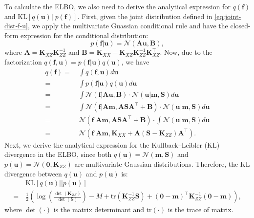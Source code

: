 \documentclass[journal]{IEEEtran}
\begin{document}
To calculate the ELBO, we also need to derive the analytical expression for $q(\mathbf{f})$ and $\text{KL}[q(\mathbf{u})||p(\mathbf{f})]$. 
First, given the joint distribution defined in \eqref{eq:joint-dist-f-u}, we apply the multivariate Guassian conditional rule and have the closed-form expression for the conditional distribution:
\[
    p(\mathbf{f}|\mathbf{u}) = \mathcal{N}(\mathbf{A} \mathbf{u}, \mathbf{B}),
\]
where $\mathbf{A} = \mathbf{K}_{XZ} \mathbf{K}_{ZZ}^{-1}$ and $\mathbf{B} = \mathbf{K}_{XX} - \mathbf{K}_{XZ} \mathbf{K}_{ZZ}^{-1} \mathbf{K}_{XZ}^\top$.
Now, due to the factorization $q(\mathbf{f}, \mathbf{u}) = p(\mathbf{f} | \mathbf{u}) q(\mathbf{u})$, we have
\begingroup
\allowdisplaybreaks
\begin{align*}
    q(\mathbf{f})
    =&~\int q(\mathbf{f}, \mathbf{u}) d\mathbf{u}\\
    =&~\int p(\mathbf{f} | \mathbf{u}) q(\mathbf{u}) d\mathbf{u}\\
    =&~\int \mathcal{N}(\mathbf{f}|\mathbf{A}\mathbf{u}, \mathbf{B})\cdot \mathcal{N}(\mathbf{u}|\mathbf{m},\mathbf{S}) d\mathbf{u}\\
    =&~\int \mathcal{N}(\mathbf{f}|\mathbf{A}\mathbf{m}, \mathbf{A}\mathbf{S}\mathbf{A}^\top + \mathbf{B})\cdot \mathcal{N}(\mathbf{u}|\mathbf{m},\mathbf{S}) d\mathbf{u}\\
    =&~\mathcal{N}(\mathbf{f}|\mathbf{A}\mathbf{m}, \mathbf{A}\mathbf{S}\mathbf{A}^\top + \mathbf{B}) \cdot \int \mathcal{N}(\mathbf{u}|\mathbf{m},\mathbf{S}) d\mathbf{u}\\
    =&~\mathcal{N}(\mathbf{f}|\mathbf{A}\mathbf{m}, \mathbf{K}_{XX} + \mathbf{A} (\mathbf{S} - \mathbf{K}_{ZZ}) \mathbf{A}^\top).
\end{align*}
\endgroup
Next, we derive the analytical expression for the Kullback–Leibler (KL) divergence in the ELBO, 
since both $q(\mathbf{u}) = \mathcal{N}(\mathbf{m}, \mathbf{S})$ and $p(\mathbf{u}) = \mathcal{N}(\mathbf{0},\mathbf{K}_{ZZ})$ are multivariate Gaussian distributions. 
Therefore, the KL divergence between $q(\mathbf{u})$ and $p(\mathbf{u})$ is:
\begin{align*}
    &~ \text{KL}\left [ q(\mathbf{u}) || p(\mathbf{u}) \right ] \\
    = &~ \frac{1}{2}\left( \log\left( \frac{\det(\mathbf{K}_{ZZ})}{\det(\mathbf{S})} \right) - M + \text{tr}(\mathbf{K}_{ZZ}^{-1} \mathbf{S}) + (\mathbf{0} - \mathbf{m})^\top \mathbf{K}_{ZZ}^{-1} (\mathbf{0} - \mathbf{m})\right),
\end{align*}
where $\det(\cdot)$ is the matrix determinant and $\text{tr}(\cdot)$ is the trace of matrix. 
\end{document}
